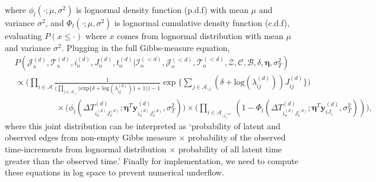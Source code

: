   	       where $\phi_l(\cdot; \mu, \sigma^2)$ is lognormal density function (p.d.f) with mean $\mu$ and variance $\sigma^2$, and $\Phi_l(\cdot; \mu, \sigma^2)$ is lognormal cumulative density function (c.d.f), evaluating $P(x \leq \cdot) $ where $x$ comes from lognormal distribution with mean $\mu$ and variance $\sigma^2$. Plugging in the full Gibbs-measure equation,
  	       \begin{equation}
  	       \begin{aligned}
  	       &P(\mathcal{J}^{(d)}_{\mbox{a}},\mathcal{T}^{(d)}_{\mbox{a}}, i^{(d)}_{\mbox{o}}, J^{(d)}_{\mbox{o}}, t^{(d)}_{\mbox{o}} |\mathcal{I}^{(<d)}_{\mbox{o}}, \mathcal{J}^{(<d)}_{\mbox{o}}, \mathcal{T}^{(<d)}_{\mbox{o}}, \mathcal{Z}, \mathcal{C}, \mathcal{B}, \delta,\boldsymbol{\eta}, \sigma_T^2)\\&\propto \Big(\prod_{i\in \mathcal{A}}\frac{1}{\Big(\prod_{j \in \mathcal{A}_{\backslash i}} \Big(\mbox{exp}\{\delta+\mbox{log}(\lambda_{ij}^{(d)})\} + 1\Big)\Big)-1}\exp\Big\{ \sum_{j \in \mathcal{A}_{\backslash i}} (\delta+\mbox{log}(\lambda_{ij}^{(d)}))J_{ij}^{(d)} \Big\}\Big)\\& \quad\quad\quad\quad\quad\times \Big(\phi_l(\Delta T^{(d)}_{i_o^{(d)}J_o^{(d)}}; \boldsymbol{\eta}^T\boldsymbol{y}^{(d)}_{i_o^{(d)}J_o^{(d)}}, \sigma_T^2)\Big)\times \Big( \prod_{i\in \mathcal{A}_{\backslash i_o^{(d)}}} (1 - \Phi_l(\Delta T^{(d)}_{i_o^{(d)}J_o^{(d)}};\boldsymbol{\eta}^T\boldsymbol{y}^{(d)}_{iJ_i}, \sigma_T^2))\Big),
  	       \end{aligned}\label{eqn:jointIJT}
  	       \end{equation}
  	       where this joint distribution can be interpreted as `probability of latent and observed edges from non-empty Gibbs measure $\times$ probability of the observed time-increments from lognormal distribution $\times$ probability of all latent time greater than the observed time.' Finally for implementation, we need to compute these equations in log space to prevent numerical underflow.
